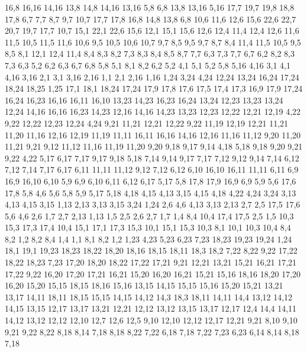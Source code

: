 16,8
16,16
14,16
%
13,8
14,8
14,16
13,16
%
5,8
6,8
13,8
13,16
5,16
%
17,7
19,7
19,8
18,8
17,8
%
6,7
7,7
8,7
9,7
10,7
17,7
17,8
16,8
14,8
13,8
6,8
%
10,6
11,6
12,6
15,6
22,6
22,7
20,7
19,7
17,7
10,7
%
15,1
22,1
22,6
15,6
%
12,1
15,1
15,6
12,6
12,4
%
11,4
12,4
12,6
11,6
11,5
%
10,5
11,5
11,6
10,6
%
9,5
10,5
10,6
10,7
9,7
%
8,5
9,5
9,7
8,7
%
8,4
11,4
11,5
10,5
9,5
8,5
%
8,1
12,1
12,4
11,4
8,4
8,3
8,2
%
7,3
8,3
8,4
8,5
8,7
7,7
%
6,3
7,3
7,7
6,7
%
6,2
8,2
8,3
7,3
6,3
%
5,2
6,2
6,3
6,7
6,8
5,8
%
5,1
8,1
8,2
6,2
5,2
%
4,1
5,1
5,2
5,8
5,16
4,16
%
3,1
4,1
4,16
3,16
%
2,1
3,1
3,16
2,16
%
1,1
2,1
2,16
1,16
1,24
3,24
4,24
12,24
13,24
16,24
17,24
18,24
18,25
1,25
%
17,1
18,1
18,24
17,24
17,9
17,8
17,6
17,5
17,4
17,3
%
16,9
17,9
17,24
16,24
16,23
16,16
16,11
16,10
%
13,23
14,23
16,23
16,24
13,24
%
12,23
13,23
13,24
12,24
%
14,16
16,16
16,23
14,23
%
12,16
14,16
14,23
13,23
12,23
12,22
12,21
12,19
%
4,22
9,22
12,22
12,23
12,24
4,24
%
9,21
11,21
12,21
12,22
9,22
%
11,19
12,19
12,21
11,21
11,20
%
11,16
12,16
12,19
11,19
%
11,11
16,11
16,16
14,16
12,16
11,16
11,12
%
9,20
11,20
11,21
9,21
%
9,12
11,12
11,16
11,19
11,20
9,20
9,18
9,17
9,14
%
4,18
5,18
9,18
9,20
9,21
9,22
4,22
%
5,17
6,17
7,17
9,17
9,18
5,18
%
7,14
9,14
9,17
7,17
%
7,12
9,12
9,14
7,14
%
6,12
7,12
7,14
7,17
6,17
%
6,11
11,11
11,12
9,12
7,12
6,12
%
6,10
16,10
16,11
11,11
6,11
%
6,9
16,9
16,10
6,10
%
5,9
6,9
6,10
6,11
6,12
6,17
5,17
%
5,8
17,8
17,9
16,9
6,9
5,9
%
5,6
17,6
17,8
5,8
%
4,6
5,6
5,8
5,9
5,17
5,18
4,18
4,15
4,13
%
3,15
4,15
4,18
4,22
4,24
3,24
%
3,13
4,13
4,15
3,15
%
1,13
2,13
3,13
3,15
3,24
1,24
%
2,6
4,6
4,13
3,13
2,13
2,7
%
2,5
17,5
17,6
5,6
4,6
2,6
%
1,7
2,7
2,13
1,13
%
1,5
2,5
2,6
2,7
1,7
%
1,4
8,4
10,4
17,4
17,5
2,5
1,5
%
10,3
15,3
17,3
17,4
10,4
%
15,1
17,1
17,3
15,3
%
10,1
15,1
15,3
10,3
%
8,1
10,1
10,3
10,4
8,4
8,2
%
1,2
8,2
8,4
1,4
%
1,1
8,1
8,2
1,2
1,23
4,23
5,23
6,23
7,23
18,23
19,23
19,24
1,24
%
18,1
19,1
19,23
18,23
18,22
18,20
18,16
18,15
18,11
18,3
18,2
%
7,22
8,22
9,22
17,22
18,22
18,23
7,23
%
17,20
18,20
18,22
17,22
17,21
%
9,21
12,21
13,21
15,21
16,21
17,21
17,22
9,22
%
16,20
17,20
17,21
16,21
%
15,20
16,20
16,21
15,21
%
15,16
18,16
18,20
17,20
16,20
15,20
%
15,15
18,15
18,16
15,16
%
13,15
14,15
15,15
15,16
15,20
15,21
13,21
13,17
%
14,11
18,11
18,15
15,15
14,15
14,12
%
14,3
18,3
18,11
14,11
14,4
%
13,12
14,12
14,15
13,15
%
12,17
13,17
13,21
12,21
%
12,12
13,12
13,15
13,17
12,17
%
12,4
14,4
14,11
14,12
13,12
12,12
12,10
12,7
12,6
12,5
%
9,10
12,10
12,12
12,17
12,21
9,21
%
8,10
9,10
9,21
9,22
8,22
8,18
8,14
%
7,18
8,18
8,22
7,22
%
6,18
7,18
7,22
7,23
6,23
%
6,14
8,14
8,18
7,18

